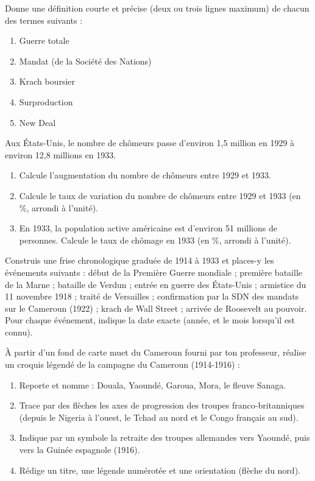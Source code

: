 \documentclass[11pt]{article}
\newcommand{\cle}[1]{{\popxbold\color{popdark}#1}}
\newcounter{popsec}
\newcounter{popsub}
\newcommand{\courssub}[1]{%
  \stepcounter{popsub}%
  \par\vspace{9pt}\noindent{\popxbold\fontsize{11.5}{13}\selectfont\color{popink}{\color{poporange}\thepopsec.\thepopsub}\hspace{6pt}#1}\par\nopagebreak\vspace{4pt}
}
\begin{document}
\begin{exercice}
Donne une définition courte et précise (deux ou trois lignes maximum) de chacun des termes suivants :
\begin{enumerate}
\item \cle{Guerre totale}
\item \cle{Mandat} (de la Société des Nations)
\item \cle{Krach boursier}
\item \cle{Surproduction}
\item \cle{New Deal}
\end{enumerate}
\end{exercice}

\begin{exercice}
Aux États-Unis, le nombre de chômeurs passe d'environ 1,5 million en 1929 à environ 12,8 millions en 1933.
\begin{enumerate}
\item Calcule l'augmentation du nombre de chômeurs entre 1929 et 1933.
\item Calcule le taux de variation du nombre de chômeurs entre 1929 et 1933 (en \%, arrondi à l'unité).
\item En 1933, la population active américaine est d'environ 51 millions de personnes. Calcule le taux de chômage en 1933 (en \%, arrondi à l'unité).
\end{enumerate}
\end{exercice}

\courssub{Je m'entraîne}

\begin{exercice}
Construis une frise chronologique graduée de 1914 à 1933 et places-y les événements suivants : début de la Première Guerre mondiale ; première bataille de la Marne ; bataille de Verdun ; entrée en guerre des États-Unis ; armistice du 11 novembre 1918 ; traité de Versailles ; confirmation par la SDN des mandats sur le Cameroun (1922) ; krach de Wall Street ; arrivée de Roosevelt au pouvoir. Pour chaque événement, indique la date exacte (année, et le mois lorsqu'il est connu).
\end{exercice}

\begin{exercice}
À partir d'un fond de carte muet du Cameroun fourni par ton professeur, réalise un croquis légendé de la campagne du Cameroun (1914-1916) :
\begin{enumerate}
\item Reporte et nomme : Douala, Yaoundé, Garoua, Mora, le fleuve Sanaga.
\item Trace par des flèches les axes de progression des troupes franco-britanniques (depuis le Nigeria à l'ouest, le Tchad au nord et le Congo français au sud).
\item Indique par un symbole la retraite des troupes allemandes vers Yaoundé, puis vers la Guinée espagnole (1916).
\item Rédige un titre, une légende numérotée et une orientation (flèche du nord).
\end{enumerate}
\end{exercice}
\end{document}
